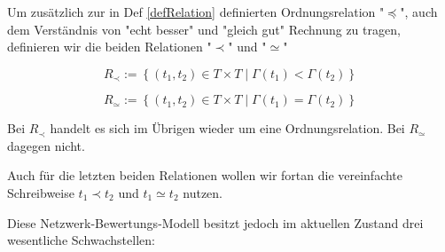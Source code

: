 \vspace{0.3cm}

\begin{Def}\label{defRelationen}

Um zusätzlich zur in Def \ref{defRelation} definierten Ordnungsrelation "$\preceq$", auch dem Verständnis von "echt besser" und "gleich gut" Rechnung zu tragen, definieren wir die beiden Relationen "$\prec$" und "$\simeq$"

\vspace{0.3cm}

\begin{equation*}
  R_{\prec}:= \left\{ (t_1, t_2) \in T \times T \mid \Gamma(t_1) < \Gamma(t_2) \right\}
\end{equation*}

\begin{equation*}
  R_{\simeq}:= \left\{ (t_1, t_2) \in T \times T \mid \Gamma(t_1) = \Gamma(t_2) \right\}
\end{equation*}

\vspace{1cm}

Bei $R_{\prec}$ handelt es sich im Übrigen wieder um eine Ordnungsrelation. Bei $R_{\simeq}$ dagegen nicht.

\end{Def}

\vspace{0.3cm}

Auch für die letzten beiden Relationen wollen wir fortan die vereinfachte Schreibweise $t_1 \prec t_2$ und $t_1 \simeq t_2$ nutzen. 

\vspace{1cm}

Diese Netzwerk-Bewertungs-Modell besitzt jedoch im aktuellen Zustand drei wesentliche Schwachstellen:

